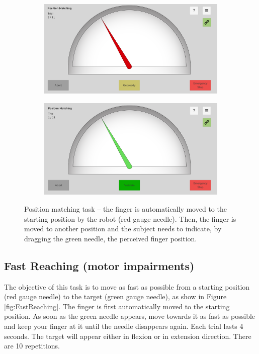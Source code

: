\documentclass[10pt,oneside,a4paper]{article}
\begin{document}
\begin{figure}[h!]
\centering
\begin{subfigure}[b]{0.48\textwidth}
	\includegraphics[width=\textwidth]{images/Assessments/PositionMatching1.png}
\end{subfigure}
\hfill
\begin{subfigure}[b]{0.48\textwidth}
	\includegraphics[width=\textwidth]{images/Assessments/PositionMatching2.png}
\end{subfigure}
\caption{Position matching task – the finger is automatically moved to the starting position by the robot (red gauge needle). Then, the finger is moved to another position and the subject needs to indicate, by dragging the green needle, the perceived finger position.}
\label{fig:PositionMatching}
\end{figure}

\subsection{Fast Reaching (motor impairments)}
The objective of this task is to move as fast as possible from a starting position (red gauge needle) to the target (green gauge needle), as show in Figure \ref{fig:FastReaching}. The finger is first automatically moved to the starting position. As soon as the green needle appears, move towards it as fast as possible and keep your finger at it until the needle disappears again. Each trial lasts 4 seconds. The target will appear either in flexion or in extension direction. There are 10 repetitions. 
\end{document}
